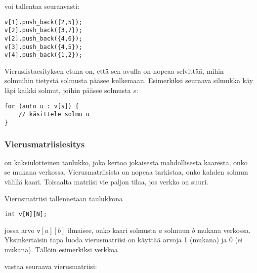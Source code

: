 voi tallentaa seuraavasti:
\begin{lstlisting}
v[1].push_back({2,5});
v[2].push_back({3,7});
v[2].push_back({4,6});
v[3].push_back({4,5});
v[4].push_back({1,2});
\end{lstlisting}

Vieruslistaesityksen etuna on, että sen avulla on nopeaa selvittää,
mihin solmuihin tietystä solmusta pääsee kulkemaan.
Esimerkiksi seuraava silmukka käy läpi kaikki solmut,
joihin pääsee solmusta $s$:

\begin{lstlisting}
for (auto u : v[s]) {
    // käsittele solmu u
}
\end{lstlisting}

\subsubsection{Vierusmatriisiesitys}


 on kaksiulotteinen taulukko,
joka kertoo jokaisesta mahdollisesta kaaresta,
onko se mukana verkossa.
Vierusmatriisista on nopeaa tarkistaa,
onko kahden solmun välillä kaari.
Toisaalta matriisi vie paljon tilaa,
jos verkko on suuri.

Vierusmatriisi tallennetaan taulukkona

\begin{lstlisting}
int v[N][N];
\end{lstlisting}

jossa arvo $\texttt{v}[a][b]$ ilmaisee,
onko kaari solmusta $a$ solmuun $b$ mukana verkossa.
Yksinkertaisin tapa luoda vierusmatriisi
on käyttää arvoja 1 (mukana) ja 0 (ei mukana).
Tällöin esimerkiksi verkkoa

\begin{center}
\end{center}

vastaa seuraava vierusmatriisi:

